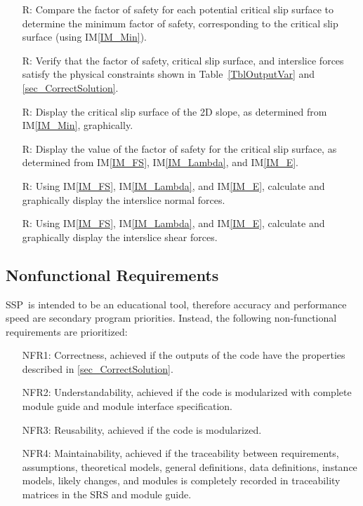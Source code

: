 \documentclass[12pt]{article}
\newcommand{\progname}{SSP}
\newcommand{\iref}[1]{IM\ref{#1}}
\newcounter{reqnum} %
\begin{document}
\begin{itemize}
\item[R\refstepcounter{reqnum}\thereqnum \label{R_Minimize}:] Compare the 
factor of safety for each potential critical slip surface to determine the 
minimum factor of safety, corresponding to the critical slip surface (using 
\iref{IM_Min}).

\item[R\refstepcounter{reqnum}\thereqnum \label{R_VerifyOutput}:] Verify that 
the factor of safety, critical slip surface, and interslice forces satisfy the 
physical constraints shown in Table~\ref{TblOutputVar} and 
\ref{sec_CorrectSolution}.

\item[R\refstepcounter{reqnum}\thereqnum \label{R_CritGraph}:] Display
  the critical slip surface of the 2D slope, as determined from \iref{IM_Min}, 
  graphically. 
  
\item[R\refstepcounter{reqnum}\thereqnum \label{R_OutputFS}:] Display the value 
of the factor of safety for the critical slip surface, as determined from 
\iref{IM_FS}, \iref{IM_Lambda}, and \iref{IM_E}.

\item[R\refstepcounter{reqnum}\thereqnum \label{R_NormalGraph}:] Using 
\iref{IM_FS}, \iref{IM_Lambda}, and \iref{IM_E}, calculate and 
graphically display the interslice normal forces.

\item[R\refstepcounter{reqnum}\thereqnum \label{R_ShearGraph}:] Using 
\iref{IM_FS}, \iref{IM_Lambda}, and \iref{IM_E}, calculate and 
graphically display the interslice shear forces.
  
\end{itemize}


\subsection{Nonfunctional Requirements}

\progname\ is intended to be an educational tool, therefore accuracy and
performance speed are secondary program priorities. Instead, the following 
non-functional requirements are prioritized:

\begin{itemize}
\item[NFR1:] Correctness, achieved if the outputs of the code have the 
properties described 
in \ref{sec_CorrectSolution}.
\item[NFR2:] Understandability, achieved if the code is modularized with 
complete module guide and module interface specification.
\item[NFR3:] Reusability, achieved if the code is modularized.
\item[NFR4:] Maintainability, achieved if the traceability between 
requirements, assumptions, theoretical models, general definitions, data 
definitions, instance models, likely changes, and modules is completely 
recorded in traceability matrices in the SRS and module guide.
\end{itemize}
\end{document}
